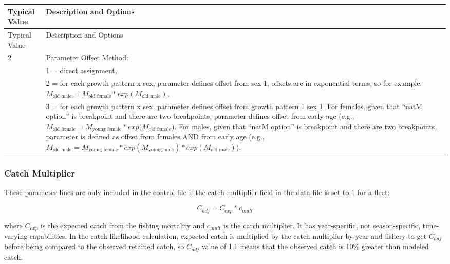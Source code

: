 \begin{longtable}{p{0.5cm} p{2cm} p{13cm}}
	\hline	
	\multicolumn{2}{l}{Typical Value} & Description and Options\Tstrut\Bstrut\\
	\hline
	\endfirsthead

	\hline
	\multicolumn{2}{l}{Typical Value} & Description and Options\Tstrut\Bstrut\\
	\hline
	\endhead
	\hline

	\endfoot
	
	\endlastfoot

	 2 & & Parameter Offset Method: \Tstrut\Bstrut\\
	   & & 1 = direct assignment, \\
	   & & 2 = for each growth pattern x sex, parameter defines offset from sex 1, offsets are in exponential terms, so for example: $M_{\text{old male}} = M_{\text{old female}}*exp(M_{\text{old male}})$, \\
	   & & 3 = for each growth pattern x sex, parameter defines offset from growth pattern 1 sex 1.  For females, given that “natM option” is breakpoint and there are two breakpoints, parameter defines offset from early age (e.g., $M_{\text{old female}} = M_{\text{young female}}*exp(M_{\text{old female}}$). For males, given that “natM option” is breakpoint and there are two breakpoints, parameter is defined as offset from females AND from early age (e.g., $M_{\text{old male}} = M_{\text{young female}}*exp(M_{\text{young male}})*exp(M_{\text{old male}})$).\Bstrut\\
	\hline
\end{longtable}


\subsubsection{Catch Multiplier}
These  parameter lines are only included in the control file if the catch multiplier field in the data file is set to 1 for a fleet:

\begin{equation}
C_{adj} = C_{exp} * c_{mult}
\end{equation}

\noindent where $C_{exp}$ is the expected catch from the fishing mortality and $c_{mult}$ is the catch multiplier. It has year-specific, not season-specific, time-varying capabilities.  In the catch likelihood calculation, expected catch is multiplied by the catch multiplier by year and fishery to get $C_{adj}$ before being compared to the observed retained catch, so $C_{adj}$ value of 1.1 means that the observed catch is 10\% greater than modeled catch.

